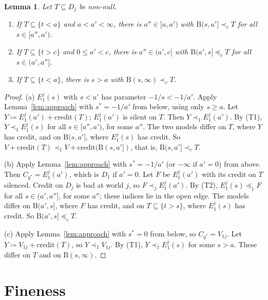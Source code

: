 \documentclass[11pt]{article}
\newtheorem{lemma}[theorem]{Lemma}
\theoremstyle{definition}\newtheorem{definition}[theorem]{Definition}
\theoremstyle{remark}\newtheorem{remark}[theorem]{Remark}
\newcommand{\cred}{\mathrm{credit}}
\newcommand{\Band}{\mathrm{B}}
\begin{document}
\begin{lemma}\label{lem:creditbands}
Let $T\subseteq D_j$ be non-null.
\begin{enumerate}[label=(\alph*)]
\item If $T\subseteq\{t<a\}$ and $a<a'<\infty$, there is $a''\in[a,a')$ with
$\Band(s,a']\prec_cT$ for all $s\in[a'',a')$.
\item If $T\subseteq\{t>c\}$ and $0\le a'<c$, there is $a''\in(a',c]$ with
$\Band(a',s]\preceq_cT$ for all $s\in(a',a'']$.
\item If $T\subseteq\{t<a\}$, there is $s>a$ with $\Band(s,\infty)\prec_cT$.
\end{enumerate}
\end{lemma}
\begin{proof}
(a) $E^j_1(s)$ with $s<a'$ has parameter $-1/s<-1/a'$. Apply
Lemma~\ref{lem:approach} with $s^*=-1/a'$ from below, using only $s\ge a$.
Let $Y\coloneqq E^j_1(a')+\cred(T)$; $E^j_1(a')$ is silent on $T$. Then
$Y\prec_1E^j_1(a')$. By (T1), $Y\prec_1E^j_1(s)$ for all $s\in[a'',a')$, for
some $a''$. The two models differ on $T$, where $Y$ has credit, and on
$\Band(s,a']$, where $E^j_1(s)$ has credit. So $V+\cred(T)\prec_1
V+\cred(\Band(s,a'])$, that is, $\Band(s,a']\prec_cT$.

(b) Apply Lemma~\ref{lem:approach} with $s^*=-1/a'$ (or $-\infty$ if $a'=0$)
from above. Then $C_{q^*}=E^j_1(a')$, which is $D_1$ if $a'=0$. Let $F$ be
$E^j_1(a')$ with its credit on $T$ silenced. Credit on $D_j$ is bad at world
$j$, so $F\prec_jE^j_1(a')$. By (T2), $E^j_1(s)\preceq_1F$ for all
$s\in(a',a'']$, for some $a''$; these indices lie in the open edge. The
models differ on $\Band(a',s]$, where $F$ has credit, and on
$T\subseteq\{t>s\}$, where $E^j_1(s)$ has credit. So $\Band(a',s]\preceq_cT$.

(c) Apply Lemma~\ref{lem:approach} with $s^*=0$ from below, so
$C_{q^*}=V_{1j}$. Let $Y\coloneqq V_{1j}+\cred(T)$, so $Y\prec_1V_{1j}$. By
(T1), $Y\prec_1E^j_1(s)$ for some $s>a$. These differ on $T$ and on
$\Band(s,\infty)$.
\end{proof}

\section{Fineness}\label{sec:fine}
\end{document}
